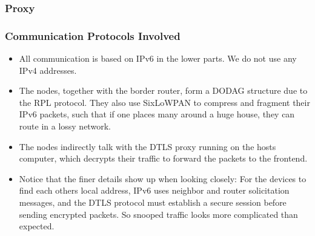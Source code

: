 \documentclass[10pt, xcolor=svgnames]{beamer}
\begin{document}
\begin{frame}
    \frametitle{Proxy}

    \begin{figure}[!hbtp]
        \centering
    \end{figure}
\end{frame}

\begin{frame}
    \frametitle{Communication Protocols Involved}

    \begin{itemize}
        \item All communication is based on IPv6 in the lower parts. We do not use any IPv4 addresses.
        \item The nodes, together with the border router, form a DODAG structure due to the RPL protocol. They also use SixLoWPAN to compress and fragment their IPv6 packets, such that if one places many around a huge house, they can route in a lossy network.
        \item The nodes indirectly talk with the DTLS proxy running on the hosts computer, which decrypts their traffic to forward the packets to the frontend.
        \item Notice that the finer details show up when looking closely: For the devices to find each others local address, IPv6 uses neighbor and router solicitation messages, and the DTLS protocol must establish a secure session before sending encrypted packets. So snooped traffic looks more complicated than expected.
    \end{itemize}

\end{frame}
\end{document}
